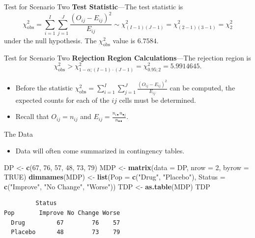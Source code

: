 \documentclass[
  ignorenonframetext,
]{beamer}
\newenvironment{Shaded}{\begin{snugshade}}{\end{snugshade}}
\newcommand{\AttributeTok}[1]{\textcolor[rgb]{0.13,0.29,0.53}{#1}}
\newcommand{\ConstantTok}[1]{\textcolor[rgb]{0.56,0.35,0.01}{#1}}
\newcommand{\DecValTok}[1]{\textcolor[rgb]{0.00,0.00,0.81}{#1}}
\newcommand{\FunctionTok}[1]{\textcolor[rgb]{0.13,0.29,0.53}{\textbf{#1}}}
\newcommand{\NormalTok}[1]{#1}
\newcommand{\OtherTok}[1]{\textcolor[rgb]{0.56,0.35,0.01}{#1}}
\newcommand{\StringTok}[1]{\textcolor[rgb]{0.31,0.60,0.02}{#1}}
\providecommand{\tightlist}{%
  \setlength{\itemsep}{0pt}\setlength{\parskip}{0pt}}
\begin{document}
\begin{frame}{Test for Scenario Two}
\protect\hypertarget{test-for-scenario-two-1}{}
\textbf{Test Statistic}---The test statistic is
\[\chi_{\text{obs}}^2=\sum_{i=1}^I \sum_{j=1}^J 
        \frac{(O_{ij}-E_{ij})^2}{E_{ij}} \sim \chi^2_{(I-1)(J-1)}=
        \chi^2_{(2-1)(3-1)}=\chi^2_2\] under the null hypothesis. The
\(\chi^2_{\text{obs}}\) value is \(6.7584\).
\end{frame}

\begin{frame}{Test for Scenario Two}
\protect\hypertarget{test-for-scenario-two-2}{}
\textbf{Rejection Region Calculations}---The rejection region is
\[\chi_{\text{obs}}^2 > \chi^2_{1-\alpha; (I-1)\cdot(J-1)} = \chi^2_{0.95;2}=5.9914645.\]

\begin{itemize}
\item
  Before the statistic
  \(\chi^2_{\text{obs}}= \sum_{i=1}^I\sum_{j=1}^J \frac{(O_{ij} - E_{ij})^2}{E_{ij}}\)
  can be computed, the expected counts for each of the \(ij\) cells must
  be determined.
\item
  Recall that \(O_{ij}=n_{ij}\) and
  \(E_{ij}=\frac{n_{i\bullet}n_{\bullet j}}{n_{\bullet\bullet}}.\)
\end{itemize}
\end{frame}

\begin{frame}[fragile]{The Data}
\protect\hypertarget{the-data}{}
\begin{itemize}
\tightlist
\item
  Data will often come summarized in contingency tables.
\end{itemize}

\begin{Shaded}
\begin{Highlighting}[]
\NormalTok{DP }\OtherTok{\textless{}{-}} \FunctionTok{c}\NormalTok{(}\DecValTok{67}\NormalTok{, }\DecValTok{76}\NormalTok{, }\DecValTok{57}\NormalTok{, }\DecValTok{48}\NormalTok{, }\DecValTok{73}\NormalTok{, }\DecValTok{79}\NormalTok{)}
\NormalTok{MDP }\OtherTok{\textless{}{-}} \FunctionTok{matrix}\NormalTok{(}\AttributeTok{data =}\NormalTok{ DP, }\AttributeTok{nrow =} \DecValTok{2}\NormalTok{, }\AttributeTok{byrow =} \ConstantTok{TRUE}\NormalTok{)}
\FunctionTok{dimnames}\NormalTok{(MDP) }\OtherTok{\textless{}{-}} \FunctionTok{list}\NormalTok{(}\AttributeTok{Pop =} \FunctionTok{c}\NormalTok{(}\StringTok{"Drug"}\NormalTok{, }\StringTok{"Placebo"}\NormalTok{), }
    \AttributeTok{Status =} \FunctionTok{c}\NormalTok{(}\StringTok{"Improve"}\NormalTok{, }\StringTok{"No Change"}\NormalTok{, }\StringTok{"Worse"}\NormalTok{))}
\NormalTok{TDP }\OtherTok{\textless{}{-}} \FunctionTok{as.table}\NormalTok{(MDP)}
\NormalTok{TDP}
\end{Highlighting}
\end{Shaded}

\begin{verbatim}
         Status
Pop       Improve No Change Worse
  Drug         67        76    57
  Placebo      48        73    79
\end{verbatim}
\end{frame}
\end{document}
